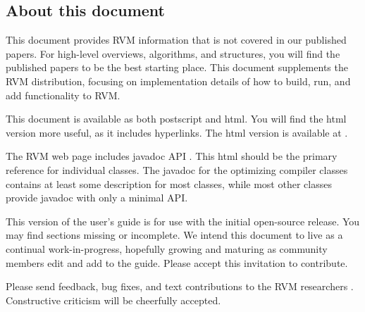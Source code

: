 \JikesTMFooter

\JavaTMFooter

\subsection {About this document}

This document provides RVM information that is not covered in
our published papers.  For high-level overviews, algorithms, and
structures, you will find the published papers to be the best starting
place. This document supplements
the RVM distribution, focusing on implementation
details of how to build, run, and add functionality to RVM.

This document is available as both postscript and html.  You will find the
html version more useful, as it includes hyperlinks. The html version is
available at 
\xlink{{\tt \RVMUserGuideURL}}{\RVMUserGuideURL}.

The RVM web page includes 
javadoc API 
. 
This html should be the
primary reference for individual classes.  The javadoc for the optimizing
compiler classes contains at least some description for most classes,
while most other classes provide javadoc with only a minimal API.

This version of the user's guide is for use with the initial open-source
release.  You may find sections missing or incomplete. We intend this
document to live as a continual work-in-progress, hopefully growing
and maturing as community members edit and add to the
guide.  Please accept this invitation to contribute.

Please send feedback, bug fixes, and text contributions to the RVM
researchers 
.  
Constructive criticism will be cheerfully 
accepted. 
